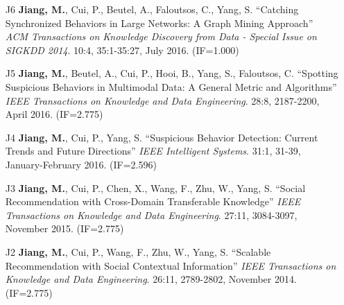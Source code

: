 \documentclass[10pt]{article}
\newenvironment{myindentpar}[1]%
{\begin{list}{}%
         {\setlength{\leftmargin}{#1}}%
         \item[]%
}
{\end{list}}
\newcounter{list}
\newcommand{\hide}[1]{}
\begin{document}
\begin{myindentpar}{0.00cm}
\begin{enumerate}[leftmargin=.5cm]
\item[J6] \textbf{Jiang, M.}, Cui, P., Beutel, A., Faloutsos, C., Yang, S. ``Catching Synchronized Behaviors in Large Networks: A Graph Mining Approach'' \textit{ACM Transactions on Knowledge Discovery from Data - Special Issue on SIGKDD 2014}. 10:4, 35:1-35:27, July 2016. (IF=1.000)

	\hide{\vspace{-0.1cm}\hspace{0.5cm}{\small \emph{I conceived the idea in consultation with Dr. Faloutsos. I designed the study, completed the experiments, and wrote the paper.}}}

\item[J5] \textbf{Jiang, M.}, Beutel, A., Cui, P., Hooi, B., Yang, S., Faloutsos, C. ``Spotting Suspicious Behaviors in Multimodal Data: A General Metric and Algorithms'' \textit{IEEE Transactions on Knowledge and Data Engineering}. 28:8, 2187-2200, April 2016. (IF=2.775)

	\hide{\vspace{-0.1cm}\hspace{0.5cm}{\small \emph{I conceived the idea in consultation with Dr. Faloutsos. I designed the study, completed the experiments, and wrote the paper.}}}

\item[J4] \textbf{Jiang, M.}, Cui, P., Yang, S. ``Suspicious Behavior Detection: Current Trends and Future Directions'' \textit{IEEE Intelligent Systems}. 31:1, 31-39, January-February 2016. (IF=2.596)

	\hide{\vspace{-0.1cm}\hspace{0.5cm}{\small \emph{I conceived the idea in consultation with Dr. Cui. I designed the survey and wrote the paper. Dr. Cui edited the paper.}}}

\item[J3] \textbf{Jiang, M.}, Cui, P., Chen, X., Wang, F., Zhu, W., Yang, S. ``Social Recommendation with Cross-Domain Transferable Knowledge'' \textit{IEEE Transactions on Knowledge and Data Engineering}. 27:11, 3084-3097, November 2015. (IF=2.775)

	\hide{\vspace{-0.1cm}\hspace{0.5cm}{\small \emph{I conceived the idea in consultation with Dr. Cui. I designed the study, completed the experiments, and wrote the paper. Mr. Chen helped the experiments.}}}

\item[J2] \textbf{Jiang, M.}, Cui, P., Wang, F., Zhu, W., Yang, S. ``Scalable Recommendation with Social Contextual Information'' \textit{IEEE Transactions on Knowledge and Data Engineering}. 26:11, 2789-2802, November 2014. (IF=2.775)


\end{enumerate}
\end{myindentpar}
\end{document}
